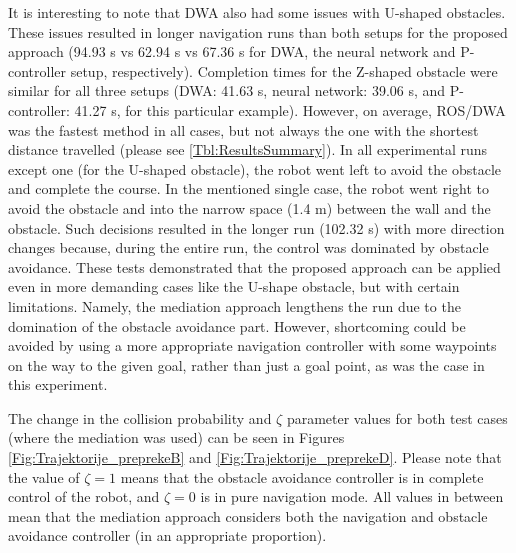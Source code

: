 It is interesting to note that DWA also had some issues with U-shaped obstacles. These issues resulted in longer navigation runs than both setups for the proposed approach (94.93 s vs 62.94 s vs 67.36 s for DWA, the neural network and P-controller setup, respectively). Completion times for the Z-shaped obstacle were similar for all three setups (DWA: 41.63 s, neural network: 39.06 s, and P-controller: 41.27 s, for this particular example). However, on average, ROS/DWA was the fastest method in all cases, but not always the one with the shortest distance travelled (please see \cref{Tbl:ResultsSummary}). In all experimental runs except one (for the U-shaped obstacle), the robot went left to avoid the obstacle and complete the course. In the mentioned single case, the robot went right to avoid the obstacle and into the narrow space (1.4 m) between the wall and the obstacle. Such decisions resulted in the longer run (102.32 s) with more direction changes because, during the entire run, the control was dominated by obstacle avoidance. These tests demonstrated that the proposed approach can be applied even in more demanding cases like the U-shape obstacle, but with certain limitations. Namely, the mediation approach lengthens the run due to the domination of the obstacle avoidance part. However, shortcoming could be avoided by using a more appropriate navigation controller with some waypoints on the way to the given goal, rather than just a goal point, as was the case in this experiment.

The change in the collision probability and $\zeta$ parameter values for both test cases (where the mediation was used) can be seen in Figures \ref{Fig:Trajektorije_preprekeB} and \ref{Fig:Trajektorije_preprekeD}. Please note that the value of $\zeta=1$ means that the obstacle avoidance controller is in complete control of the robot, and $\zeta=0$ is in pure navigation mode. All values in between mean that the mediation approach considers both the navigation and obstacle avoidance controller (in an appropriate proportion).

